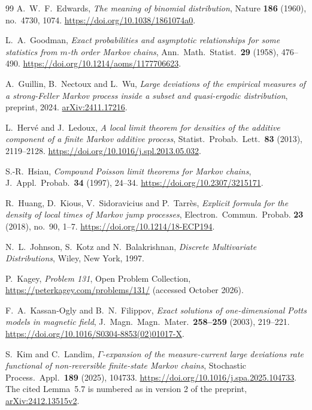 \documentclass[EJP,preprint]{ejpecp}
\theoremstyle{ejpecpbodyit}
\begin{document}
\begin{thebibliography}{99}
A.~W.~F.~Edwards, \emph{The meaning of binomial distribution}, Nature
\textbf{186} (1960), no.~4730, 1074. \url{https://doi.org/10.1038/1861074a0}.

L.~A.~Goodman, \emph{Exact probabilities and asymptotic relationships for
some statistics from $m$-th order Markov chains}, Ann.~Math.~Statist.~\textbf{29}
(1958), 476--490. \url{https://doi.org/10.1214/aoms/1177706623}.

A.~Guillin, B.~Nectoux and L.~Wu, \emph{Large deviations of the empirical
measures of a strong-Feller Markov process inside a subset and quasi-ergodic
distribution}, preprint, 2024.
\href{https://arxiv.org/abs/2411.17216}{arXiv:2411.17216}.

L.~Herv\'e and J.~Ledoux, \emph{A local limit theorem for densities of the additive
component of a finite Markov additive process}, Statist.~Probab.~Lett.~\textbf{83}
(2013), 2119--2128. \url{https://doi.org/10.1016/j.spl.2013.05.032}.

S.-R.~Hsiau, \emph{Compound Poisson limit theorems for Markov chains},
J.~Appl.~Probab.~\textbf{34} (1997), 24--34.
\url{https://doi.org/10.2307/3215171}.

R.~Huang, D.~Kious, V.~Sidoravicius and P.~Tarr\`es, \emph{Explicit formula for
the density of local times of Markov jump processes}, Electron.~Commun.~Probab.
\textbf{23} (2018), no.~90, 1--7. \url{https://doi.org/10.1214/18-ECP194}.

N.~L.~Johnson, S.~Kotz and N.~Balakrishnan, \emph{Discrete Multivariate
Distributions}, Wiley, New York, 1997.

P.~Kagey, \emph{Problem 131}, Open Problem Collection,
\url{https://peterkagey.com/problems/131/} (accessed October 2026).

F.~A.~Kassan-Ogly and B.~N.~Filippov, \emph{Exact solutions of one-dimensional
Potts models in magnetic field}, J.~Magn.~Magn.~Mater.~\textbf{258--259} (2003),
219--221. \url{https://doi.org/10.1016/S0304-8853(02)01017-X}.

S.~Kim and C.~Landim, \emph{$\Gamma$-expansion of the measure-current large
deviations rate functional of non-reversible finite-state Markov chains},
Stochastic Process.~Appl.~\textbf{189} (2025), 104733.
\url{https://doi.org/10.1016/j.spa.2025.104733}.
The cited Lemma~5.7 is numbered as in version 2 of the preprint,
\href{https://arxiv.org/abs/2412.13515v2}{arXiv:2412.13515v2}.


\end{thebibliography}
\end{document}

